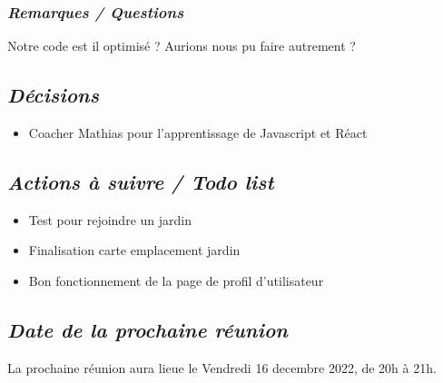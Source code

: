 \documentclass[french,a4paper]{article}
\begin{document}
\subsubsection*{\textit{Remarques / Questions}}
Notre code est il optimisé ? Aurions nous pu faire autrement ?

\subsection*{\textit{Décisions}}
\begin{itemize}
  \item Coacher Mathias pour l'apprentissage de Javascript et  Réact 
\end{itemize}

\subsection*{\textit{Actions à suivre / Todo list}}
\begin{itemize}
  \item Test pour rejoindre un jardin
  \item Finalisation carte emplacement jardin
  \item Bon fonctionnement de la page de profil d'utilisateur
\end{itemize}

\subsection*{\textit{Date de la prochaine réunion}}
La prochaine réunion aura lieue le Vendredi 16 decembre 2022, de 20h à 21h.
\end{document}
